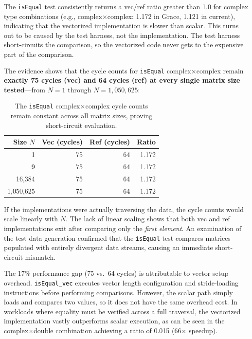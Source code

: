 The \texttt{isEqual} test consistently returns a vec/ref ratio greater than 1.0 for complex type combinations (e.g., complex$\times$complex: 1.172 in Grace, 1.121 in current), indicating that the vectorized implementation is slower than scalar. This turns out to be caused by the test harness, not the implementation. The test harness short-circuits the comparison, so the vectorized code never gets to the expensive part of the comparison.

The evidence shows that the cycle counts for \texttt{isEqual} complex$\times$complex remain \textbf{exactly 75 cycles (vec) and 64 cycles (ref) at every single matrix size tested}---from $N=1$ through $N=1{,}050{,}625$:

\begin{table}[H]
\centering
\caption{The \texttt{isEqual} complex$\times$complex cycle counts remain constant across all matrix sizes, proving short-circuit evaluation.}
\label{tab:isequal-evidence}
\small
\begin{tabular}{r r r r}
\toprule
Size $N$ & Vec (cycles) & Ref (cycles) & Ratio \\
\midrule
1 & 75 & 64 & 1.172 \\
9 & 75 & 64 & 1.172 \\
16,384 & 75 & 64 & 1.172 \\
1,050,625 & 75 & 64 & 1.172 \\
\bottomrule
\end{tabular}
\end{table}

If the implementations were actually traversing the data, the cycle counts would scale linearly with $N$. The lack of linear scaling shows that both vec and ref implementations exit after comparing only the \emph{first element}. An examination of the test data generation confirmed that the \texttt{isEqual} test compares matrices populated with entirely divergent data streams, causing an immediate short-circuit mismatch.

The 17\% performance gap (75 vs.\ 64 cycles) is attributable to vector setup overhead. \texttt{isEqual\_vec} executes vector length configuration and stride-loading instructions before performing comparisons. However, the scalar path simply loads and compares two values, so it does not have the same overhead cost. In workloads where equality must be verified across a full traversal, the vectorized implementation vastly outperforms scalar execution, as can be seen in the complex$\times$double combination achieving a ratio of 0.015 (66$\times$ speedup).

